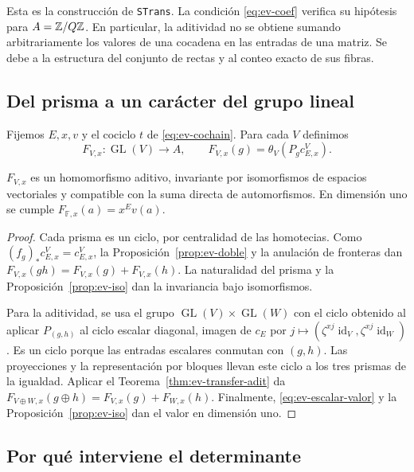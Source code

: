Esta es la construcción de \texttt{STrans}. La condición \eqref{eq:ev-coef} verifica su hipótesis para $A=\mathbb{Z}/Q\mathbb{Z}$. En particular, la aditividad no se obtiene sumando arbitrariamente los valores de una cocadena en las entradas de una matriz. Se debe a la estructura del conjunto de rectas y al conteo exacto de sus fibras.

\subsection{Del prisma a un carácter del grupo lineal}

Fijemos $E,x,v$ y el cociclo $t$ de \eqref{eq:ev-cochain}. Para cada $V$ definimos
\begin{equation}
 F_{V,x}:\operatorname{GL}(V)\to A,\qquad
 F_{V,x}(g)=\theta_V(P_g c_{E,x}^V).
 \label{eq:ev-FV}
\end{equation}
\begin{proposicion}
\label{prop:ev-caracter}
$F_{V,x}$ es un homomorfismo aditivo, invariante por isomorfismos de espacios vectoriales y compatible con la suma directa de automorfismos. En dimensión uno se cumple $F_{\mathbb F,x}(a)=x^Ev(a)$.
\end{proposicion}
\begin{proof}
Cada prisma es un ciclo, por centralidad de las homotecias. Como $(f_g)_*c_{E,x}^V=c_{E,x}^V$, la Proposición~\ref{prop:ev-doble} y la anulación de fronteras dan $F_{V,x}(gh)=F_{V,x}(g)+F_{V,x}(h)$. La naturalidad del prisma y la Proposición~\ref{prop:ev-iso} dan la invariancia bajo isomorfismos.

Para la aditividad, se usa el grupo $\operatorname{GL}(V)\times\operatorname{GL}(W)$ con el ciclo obtenido al aplicar $P_{(g,h)}$ al ciclo escalar diagonal, imagen de $c_E$ por $j\mapsto(\zeta^{xj}\operatorname{id}_V,\zeta^{xj}\operatorname{id}_W)$. Es un ciclo porque las entradas escalares conmutan con $(g,h)$. Las proyecciones y la representación por bloques llevan este ciclo a los tres prismas de la igualdad. Aplicar el Teorema~\ref{thm:ev-transfer-adit} da $F_{V\oplus W,x}(g\oplus h)=F_{V,x}(g)+F_{W,x}(h)$. Finalmente, \eqref{eq:ev-escalar-valor} y la Proposición~\ref{prop:ev-iso} dan el valor en dimensión uno.
\end{proof}

\subsection{Por qué interviene el determinante}


